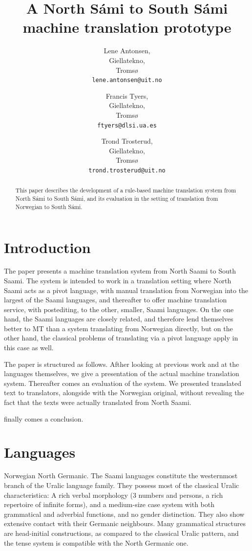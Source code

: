 \documentclass[a4paper,11pt,twocolumn]{article}
\title{A North Sámi to South Sámi machine translation prototype}
\author{Lene Antonsen,\\Giellatekno,\\Tromsø\\{\tt lene.antonsen@uit.no}
\and Francis Tyers,\\Giellatekno,\\Tromsø\\{\tt ftyers@dlsi.ua.es}
\and Trond Trosterud,\\Giellatekno,\\Tromsø\\{\tt trond.trosterud@uit.no}}
\date{}
\begin{document}
\maketitle


\begin{abstract}
This paper describes the development of a rule-based
machine translation system from North Sámi to South
Sámi, and its evaluation in the setting of translation
from Norwegian to South Sámi. 
\end{abstract}

\section{Introduction}

The paper presents a machine translation system from North Saami to
South Saami. The system is intended to work in a translation setting
where North Saami acts as a pivot language, with manual translation
from Norwegian into the largest of the Saami languages, and thereafter
to offer machine translation service, with postediting, to the other,
smaller, Saami languages. On the one hand, the Saami languages are
closely related, and therefore lend themselves better to MT than a
system translating from Norwegian directly, but on the other hand, the
classical problems of translating via a pivot language apply in this
case as well. 

The paper is structured as follows. Afther looking at previous work
and at the languages themselves, we give a presentation of the actual
machine translation system. Thereafter comes an evaluation of the
system. We presented translated text to translators, alongside with
the Norwegian original, without revealing the fact that the texts were
actually translated from North Saami.

finally comes a conclusion.


\cite{tyers09} \cite{wiechetek10} \cite{trosterud12}

\cite{babych2007}

\section{Languages}

Norwegian North Germanic. The Saami languages constitute the
westernmost branch of the Uralic language family. They possess most of
the classical Uralic characteristica: A rich verbal morphology (3
numbers and persons, a rich repertoire of infinite forms), and a
medium-size case system with both grammatical and adverbial functions,
and no gender distinction. They also show extensive contact with their
Germanic neighbours. Many grammatical structures are head-initial
constructions, as compared to the classical Uralic pattern, and the
tense system is compatible with the North Germanic one.
\end{document}
